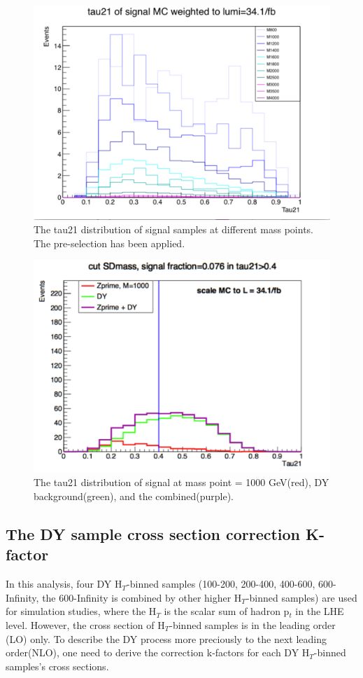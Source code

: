 \documentclass{article}
\begin{document}
\begin{figure}
\includegraphics[width=.7\textwidth]{figures/tau21_SignalSample.pdf}
\centering
\caption{The tau21 distribution of signal samples at different mass points. The pre-selection has been applied.  }
\label{pics:blablabla}
\end{figure}



\begin{figure}
\includegraphics[width=.7\textwidth]{figures/tau21_SignalBackgroundSample.pdf}
\centering
\caption{The tau21 distribution of signal at mass point = 1000 GeV(red), DY background(green), and the combined(purple).}
\label{pics:blablabla}
\end{figure}


\subsection{The DY sample cross section correction K-factor}

In this analysis, four DY H$_{T}$-binned samples (100-200, 200-400, 400-600, 600-Infinity, the 600-Infinity is combined by other higher H$_{T}$-binned samples) are used for simulation studies, where the H$_{T}$ is the scalar sum of hadron p$_{t}$ in the LHE level. However, the cross section of H$_{T}$-binned samples is in the leading order (LO) only. To describe the DY process more preciously to the next leading order(NLO), one need to derive the correction k-factors for each DY H$_{T}$-binned samples's cross sections.
\end{document}
